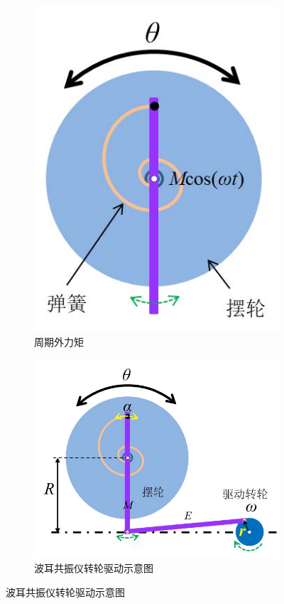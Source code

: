 \documentclass[12pt,a4paper]{amsart}
\begin{document}
\begin{figure}[H]
\begin{subfigure}[b]{0.2475\linewidth}
		\includegraphics[width=\linewidth]{img/2.jpg}
		\caption{周期外力矩}
		\label{fig:2}
	\end{subfigure}
	\hfill
	\begin{subfigure}[b]{0.405\linewidth}
		\centering
		\includegraphics[width=\linewidth]{img/3.jpg}
		\caption{波耳共振仪转轮驱动示意图}
		\label{fig:3}
	\end{subfigure}
\end{figure}
\end{document}
